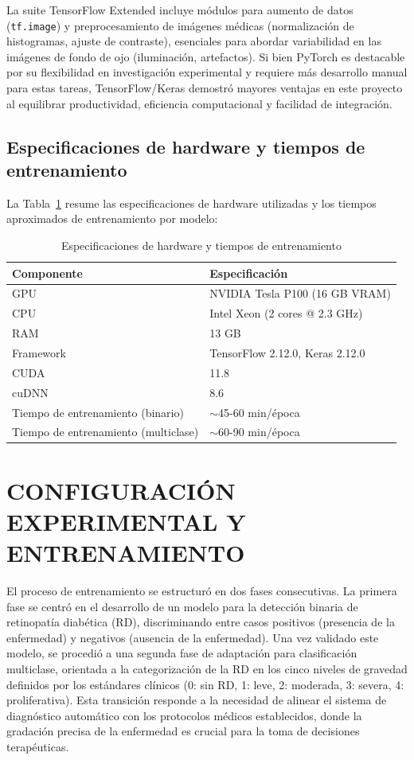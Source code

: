 La suite TensorFlow Extended incluye módulos para aumento de datos (\texttt{tf.image}) y preprocesamiento de imágenes médicas (normalización de histogramas, ajuste de contraste), esenciales para abordar variabilidad en las imágenes de fondo de ojo (iluminación, artefactos). Si bien PyTorch es destacable por su flexibilidad en investigación experimental y requiere más desarrollo manual para estas tareas, TensorFlow/Keras demostró mayores ventajas en este proyecto al equilibrar productividad, eficiencia computacional y facilidad de integración.

\subsection{Especificaciones de hardware y tiempos de entrenamiento}

La Tabla~\ref{tab:hardware-tiempos} resume las especificaciones de hardware utilizadas y los tiempos aproximados de entrenamiento por modelo:

\begin{table}[H]
\centering
\renewcommand{\arraystretch}{1.3}
\caption{Especificaciones de hardware y tiempos de entrenamiento}
\label{tab:hardware-tiempos}
\begin{tabularx}{\textwidth}{l X}
\hline
\textbf{Componente} & \textbf{Especificación} \\ \hline
GPU & NVIDIA Tesla P100 (16 GB VRAM) \\
CPU & Intel Xeon (2 cores @ 2.3 GHz) \\
RAM & 13 GB \\
Framework & TensorFlow 2.12.0, Keras 2.12.0 \\
CUDA & 11.8 \\
cuDNN & 8.6 \\
Tiempo de entrenamiento (binario) & $\sim$45-60 min/época \\
Tiempo de entrenamiento (multiclase) & $\sim$60-90 min/época \\ \hline
\end{tabularx}
\end{table}

\section{CONFIGURACIÓN EXPERIMENTAL Y ENTRENAMIENTO}

El proceso de entrenamiento se estructuró en dos fases consecutivas. La primera fase se centró en el desarrollo de un modelo para la detección binaria de retinopatía diabética (RD), discriminando entre casos positivos (presencia de la enfermedad) y negativos (ausencia de la enfermedad). Una vez validado este modelo, se procedió a una segunda fase de adaptación para clasificación multiclase, orientada a la categorización de la RD en los cinco niveles de gravedad definidos por los estándares clínicos (0: sin RD, 1: leve, 2: moderada, 3: severa, 4: proliferativa). Esta transición responde a la necesidad de alinear el sistema de diagnóstico automático con los protocolos médicos establecidos, donde la gradación precisa de la enfermedad es crucial para la toma de decisiones terapéuticas.

